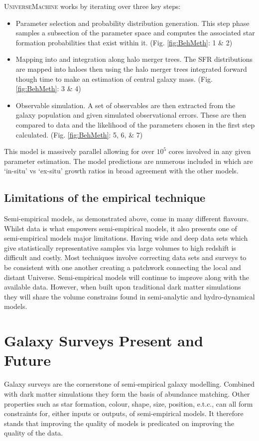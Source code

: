 U\textsc{niverse}M\textsc{achine} works by iterating over three key steps:
\begin{itemize}
    \item Parameter selection and probability distribution generation. This step phase samples a subsection of the parameter space and computes the associated star formation probabilities that exist within it. (Fig. \ref{fig:BehMeth}: 1 \& 2)
    \item Mapping into and integration along halo merger trees. The SFR distributions are mapped into haloes then using the halo merger trees integrated forward though time to make an estimation of central galaxy mass. (Fig. \ref{fig:BehMeth}: 3 \& 4)
    \item Observable simulation. A set of observables are then extracted from the galaxy population and given simulated observational errors. These are then compared to data and the likelihood of the parameters chosen in the first step calculated. (Fig. \ref{fig:BehMeth}: 5, 6, \& 7)
\end{itemize}

This model is massively parallel allowing for over $10^{5}$ cores involved in any given parameter estimation. The model predictions are numerous included in which are `in-situ' vs `ex-situ' growth ratios in broad agreement with the other models.

\subsection{Limitations of the empirical technique}
Semi-empirical models, as demonstrated above, come in many different flavours. Whilst data is what empowers semi-empirical models, it also presents one of semi-empirical models major limitations. Having wide and deep data sets which give statistically representative samples via large volumes to high redshift is difficult and costly. Most techniques involve correcting data sets and surveys to be consistent with one another creating a patchwork connecting the local and distant Universe. Semi-empirical models will continue to improve along with the available data. However, when built upon traditional dark matter simulations they will share the volume constrains found in semi-analytic and hydro-dynamical models.


\section{Galaxy Surveys Present and Future}
\label{sec:Surveys}
Galaxy surveys are the cornerstone of semi-empirical galaxy modelling. Combined with dark matter simulations they form the basis of abundance matching. Other properties such as star formation, colour, shape, size, position, e.t.c., can all form constraints for, either inputs or outputs, of semi-empirical models. It therefore stands that improving the quality of models is predicated on improving the quality of the data.

